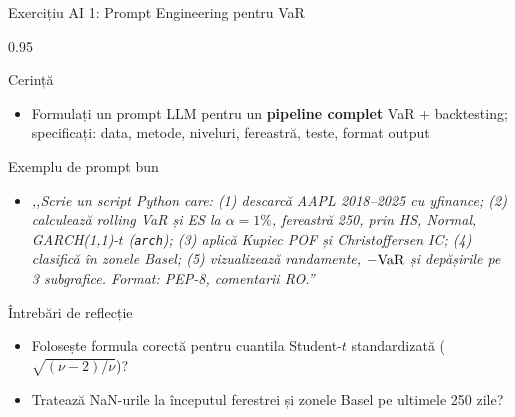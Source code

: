 \documentclass[9pt, aspectratio=169, t]{beamer}
\begin{document}
\begin{frame}[shrink=10]{Exercițiu AI 1: Prompt Engineering pentru VaR}
    \begin{cminipage}{0.95\textwidth}
    \begin{block}{Cerință}
    \begin{itemize}\setlength{\itemsep}{0pt}
        \item Formulați un prompt LLM pentru un \textbf{pipeline complet} VaR + backtesting; specificați: data, metode, niveluri, fereastră, teste, format output
    \end{itemize}
    \end{block}
    \begin{exampleblock}{Exemplu de prompt bun}
    \begin{itemize}\setlength{\itemsep}{0pt}
        \item \textit{,,Scrie un script Python care: (1) descarcă AAPL 2018--2025 cu yfinance; (2) calculează rolling VaR și ES la $\alpha = 1\%$, fereastră 250, prin HS, Normal, GARCH(1,1)-$t$ (\texttt{arch}); (3) aplică Kupiec POF și Christoffersen IC; (4) clasifică în zonele Basel; (5) vizualizează randamente, $-\text{VaR}$ și depășirile pe 3 subgrafice. Format: PEP-8, comentarii RO.''}
    \end{itemize}
    \end{exampleblock}
    \begin{alertblock}{Întrebări de reflecție}
    \begin{itemize}\setlength{\itemsep}{0pt}
        \item Folosește formula corectă pentru cuantila Student-$t$ standardizată ($\sqrt{(\nu-2)/\nu}$)?
        \item Tratează NaN-urile la începutul ferestrei și zonele Basel pe ultimele 250 zile?
    \end{itemize}
    \end{alertblock}
    \end{cminipage}
\end{frame}
\end{document}
